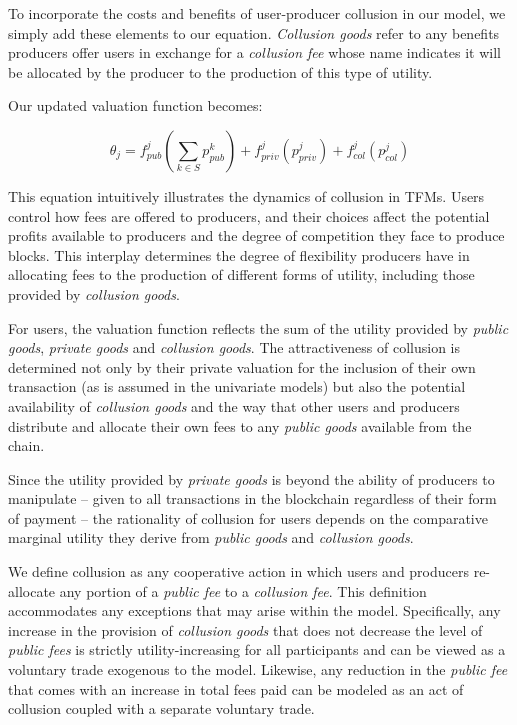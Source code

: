 \documentclass[oneside]{article}   	%
\begin{document}
To incorporate the costs and benefits of user-producer collusion in our model, we simply add these elements to our equation. \textit{Collusion goods} refer to any benefits producers offer users in exchange for a \textit{collusion fee} whose name indicates it will be allocated by the producer to the production of this type of utility.

Our updated valuation function becomes:

$$
\theta_j = f_{pub}^j\left(\sum_{k \in S} p_{pub}^{k}\right) + f_{priv}^j(p_{priv}^j) + f_{col}^j(p_{col}^j)
$$

This equation intuitively illustrates the dynamics of collusion in TFMs. Users control how fees are offered to producers, and their choices affect the potential profits available to producers and the degree of competition they face to produce blocks. This interplay determines the degree of flexibility producers have in allocating fees to the production of different forms of utility, including those provided by \textit{collusion goods}.

For users, the valuation function reflects the sum of the utility provided by \textit{public goods}, \textit{private goods} and \textit{collusion goods}. The attractiveness of collusion is determined not only by their private valuation for the inclusion of their own transaction (as is assumed in the univariate models) but also the potential availability of \textit{collusion goods} and the way that other users and producers distribute and allocate their own fees to any \textit{public goods} available from the chain.

Since the utility provided by \textit{private goods} is beyond the ability of producers to manipulate -- given to all transactions in the blockchain regardless of their form of payment -- the rationality of collusion for users depends on the comparative marginal utility they derive from \textit{public goods} and \textit{collusion goods}.

We define collusion as any cooperative action in which users and producers re-allocate any portion of a \textit{public fee} to a \textit{collusion fee}. This definition accommodates any exceptions that may arise within the model. Specifically, any increase in the provision of \textit{collusion goods} that does not decrease the level of \textit{public fees} is strictly utility-increasing for all participants and can be viewed as a voluntary trade exogenous to the model. Likewise, any reduction in the \textit{public fee} that comes with an increase in total fees paid can be modeled as an act of collusion coupled with a separate voluntary trade.
\end{document}
